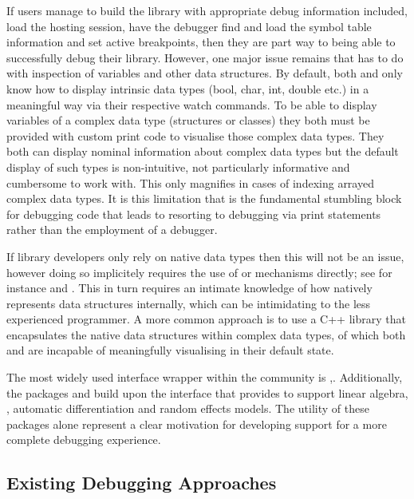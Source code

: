 If users manage to build the library with appropriate debug information included, load the hosting  session, have the debugger find and 
load the symbol table information and set active breakpoints, then they are part way to being able to successfully debug their library. However, 
one major issue remains that has to do with inspection of variables and other data structures. By default, both  and  only 
know how to display intrinsic data types (bool, char, int, double etc.) in a meaningful way via their respective watch commands. To be able to 
display variables of a complex data type (structures or classes) they both must be provided with custom print code to visualise those complex 
data types. They both can display nominal information about complex data types but the default display of such types is non-intuitive, not particularly informative
and cumbersome to work with. This only magnifies in cases of indexing arrayed complex data types. It is this limitation that is the fundamental stumbling block for 
debugging code that leads to resorting to debugging via print statements rather than the employment of a debugger. 

If library developers only rely on native data types then this will not be an issue, however doing so implicitely requires the use of  or 
 mechanisms directly; see for instance \citep{DotC} and \citep{DotC2}. This in turn requires an intimate
knowledge of how  natively represents data structures internally, which can be intimidating to the less experienced programmer. A more common approach is to 
use a C++ library that encapsulates the native  data structures within complex data types, of which both  and  are  
incapable of meaningfully visualising in their default state. 

The most widely used interface wrapper within the  community is \citep{RcppIntro},\citep{Rcpp}. Additionally, the packages  
and  build upon the interface that  provides to support linear algebra\citep{RcppEigen}, \citep{RcppEigenLA}, 
automatic differentiation\citep{TMBlaplace} and random effects models\citep{TMB}. The utility of these packages alone represent a clear motivation for 
developing support for a more complete debugging experience.

\hypertarget{exitising-debugging-approaches}{%
\subsection{Existing Debugging Approaches}
\label{exitising-debugging-approaches}}


